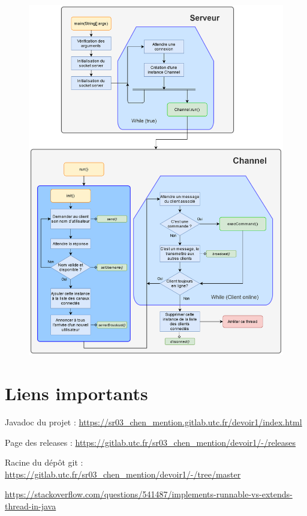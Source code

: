 \documentclass[10pt,a4paper]{article}
\begin{document}
	\begin{figure}[H]
		\includegraphics[width=\linewidth]{ressources/server_package.png}
	\end{figure}
	
	
	
	\newpage
	
	
	
	\newpage
	
	\appendix
	\section{Liens importants}
	
	Javadoc du projet : \url{https://sr03_chen_mention.gitlab.utc.fr/devoir1/index.html}
	
	Page des releases :
	\url{https://gitlab.utc.fr/sr03_chen_mention/devoir1/-/releases}
	
	Racine du dépôt git :
	\url{https://gitlab.utc.fr/sr03_chen_mention/devoir1/-/tree/master}
	
	
	\begin{thebibliography}{5}
		 \url{https://stackoverflow.com/questions/541487/implements-runnable-vs-extends-thread-in-java}
	\end{thebibliography}
	
	
	
\end{document}
